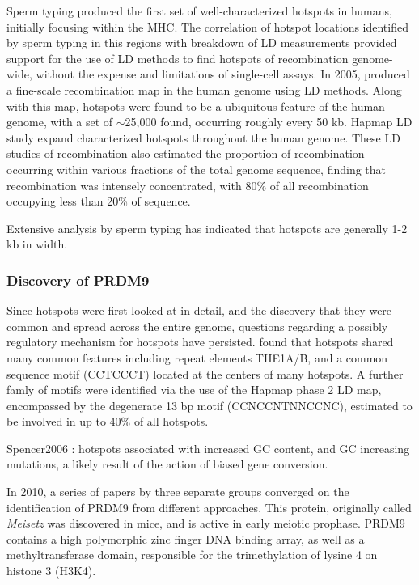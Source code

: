 Sperm typing produced the first set of well-characterized hotspots in humans, initially focusing within the MHC\cite{Jeffreys2000,Jeffreys2001}.
The correlation of hotspot locations identified by sperm typing in this regions with breakdown of LD measurements provided support for the use of LD methods to find hotspots of recombination genome-wide, without the expense and limitations of single-cell assays\cite{Jeffreys2001}.
In 2005, \citet{Myers2005} produced a fine-scale recombination map in the human genome using LD methods.
Along with this map, hotspots were found to be a ubiquitous feature of the human genome, with a set of $\sim$25,000 found, occurring roughly every 50 kb.
Hapmap LD study expand characterized hotspots throughout the human genome.
These LD studies of recombination also estimated the proportion of recombination occurring within various fractions of the total genome sequence, finding that recombination was intensely concentrated, with 80\% of all recombination occupying less than 20\% of sequence.

Extensive analysis by sperm typing has indicated that hotspots are generally 1-2 kb in width\cite{Jeffreys2004a,Arnheim2003}.


\subsubsection{Discovery of PRDM9}

Since hotspots were first looked at in detail, and the discovery that they were common and spread across the entire genome, questions regarding a possibly regulatory mechanism for hotspots have persisted.
\citet{Myers2005} found that hotspots shared many common features including repeat elements THE1A/B, and a common sequence motif (CCTCCCT) located at the centers of many hotspots.
A further famly of motifs were identified via the use of the Hapmap phase 2 LD map\cite{Hapmap2007}, encompassed by the degenerate 13 bp motif (CCNCCNTNNCCNC)\cite{Myers2008}, estimated to be involved in up to 40\% of all hotspots.

Spencer2006 : hotspots associated with increased GC content, and GC increasing mutations, a likely result of the action of biased gene conversion.


In 2010, a series of papers by three separate groups converged on the identification of PRDM9 from different approaches.
This protein, originally called \textit{Meisetz} was discovered in mice, and is active in early meiotic prophase\cite{Hayashi2005}.
PRDM9 contains a high polymorphic zinc finger DNA binding array, as well as a methyltransferase domain, responsible for the trimethylation of lysine 4 on histone 3 (H3K4).

